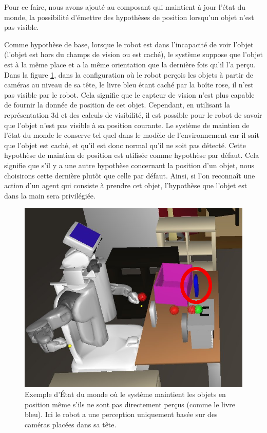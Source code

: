 \documentclass[a4paper,11pt,twoside]{StyleThese}
\begin{document}
Pour ce faire, nous avons ajouté au composant qui maintient à jour l'état du monde, la possibilité d'émettre des hypothèses de position lorsqu'un objet n'est pas visible.

Comme hypothèse de base, lorsque le robot est dans l'incapacité de voir l'objet (l'objet est hors du champs de vision ou est caché), le système suppose que l'objet est à la même place et a la même orientation que la dernière fois qu'il l'a perçu. Dans la figure \ref{fig:occluded}, dans la configuration où le robot perçois les objets à partir de caméras au niveau de sa tête, 
le livre bleu étant caché par la boîte rose, il n'est pas visible par le robot. Cela signifie que le capteur de vision n'est plus capable de fournir la donnée de position de cet objet. Cependant, en utilisant la représentation 3d et des calculs de visibilité, il est possible pour le robot de savoir que l'objet n'est pas visible à sa position courante. Le système de maintien de l'état du monde le conserve tel quel dans le modèle de l'environnement car il sait que l'objet est caché, et qu'il est donc normal qu'il ne soit pas détecté. Cette hypothèse de maintien de position est utilisée comme hypothèse par défaut. Cela signifie que s'il y a une autre hypothèse concernant la position d'un objet, nous choisirons cette dernière plutôt que celle par défaut.
Ainsi, si l'on reconnaît une action d'un agent qui consiste à prendre cet objet, l'hypothèse que l'objet est dans la main sera privilégiée.

\begin{figure}[ht!]
 \centering
  \includegraphics[width=0.69\linewidth]{./img/occluded.png} 
  \caption {Exemple d'État du monde où le système maintient les objets en position même s'ils ne sont pas directement perçus (comme le livre bleu). Ici le robot a une perception uniquement basée sur des caméras placées dans sa tête.}
  \label{fig:occluded}
\end{figure}
\end{document}
